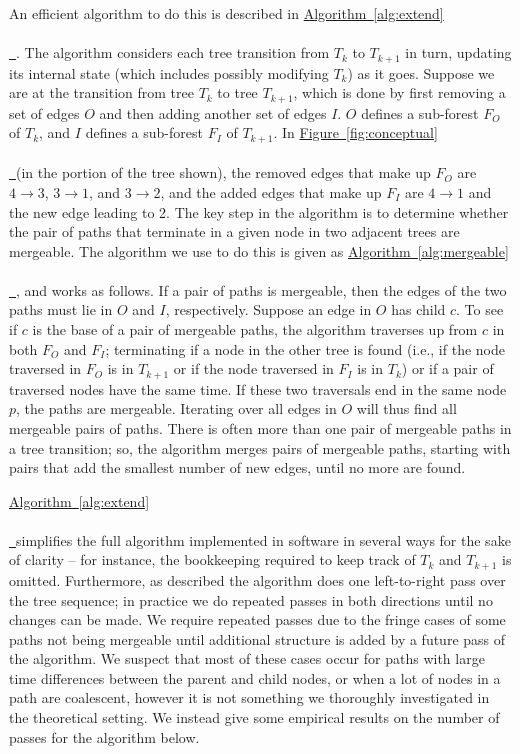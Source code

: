 \documentclass[10pt,twoside,lineno]{gsajnl}
\newcommand{\tskit}{\texttt{tskit}}
\newcommand{\algorithmref}[2][]{%
	\hyperref[{#2}]{%
		Algorithm~\ref*{#2}%
		\ifx\\#1\\%
		\else
		\,#1%
		\fi
	}%
}
\newcommand*{\figref}[2][]{%
	\hyperref[{#2}]{%
		Figure~\ref*{#2}%
		\ifx\\#1\\%
		\else
		\,#1%
		\fi
	}%
}
\begin{document}
An efficient algorithm to do this is described in \algorithmref{alg:extend}.
The algorithm considers each tree transition from $T_k$ to $T_{k+1}$ in turn, updating its internal state
(which includes possibly modifying $T_k$) as it goes.
Suppose we are at the transition from tree $T_k$ to tree $T_{k+1}$,
which is done by first removing a set of edges $O$
and then adding another set of edges $I$.
$O$ defines a sub-forest $F_O$ of $T_k$,
and $I$ defines a sub-forest $F_I$ of $T_{k+1}$.
In \figref{fig:conceptual} (in the portion of the tree shown),
the removed edges that make up $F_O$ 
are $4 \to 3$, $3 \to 1$, and $3 \to 2$,
and the added edges that make up $F_I$ are $4 \to 1$ and the new edge leading to 2.
The key step in the algorithm is to determine whether the pair of paths
that terminate in a given node in two adjacent trees are mergeable.
The algorithm we use to do this is given as \algorithmref{alg:mergeable},
and works as follows.
If a pair of paths is mergeable,
then the edges of the two paths must lie in $O$ and $I$, respectively.
Suppose an edge in $O$ has child $c$.
To see if $c$ is the base of a pair of mergeable paths,
the algorithm traverses up from $c$ in both $F_O$ and $F_I$;
terminating if a node in the other tree is found
(i.e., if the node traversed in $F_O$ is in $T_{k+1}$ or if the node traversed in $F_I$ is in $T_k$)
or if a pair of traversed nodes have the same time.
If these two traversals end in the same node $p$, the paths are mergeable.
Iterating over all edges in $O$ will thus find all mergeable pairs of paths.
There is often more than one pair of mergeable paths in a tree transition;
so, the algorithm merges pairs of mergeable paths,
starting with pairs that add the smallest number of new edges,
until no more are found.


\algorithmref{alg:extend} simplifies the full algorithm implemented in software %
in several ways for the sake of clarity --
for instance, the bookkeeping required to keep track of $T_k$ and $T_{k+1}$ is omitted.
Furthermore, as described the algorithm does one left-to-right pass over the tree sequence;
in practice we do repeated passes in both directions until no changes can be made. 
We require repeated passes due to the fringe cases of some paths not being mergeable until 
additional structure is added by a future pass of the algorithm. 
We suspect that most of these cases occur for paths with large time differences between the parent and child
nodes, or when a lot of nodes in a path are coalescent, however it is not something we thoroughly investigated
in the theoretical setting.
We instead give some empirical results on the number of passes for the algorithm below.
\end{document}
